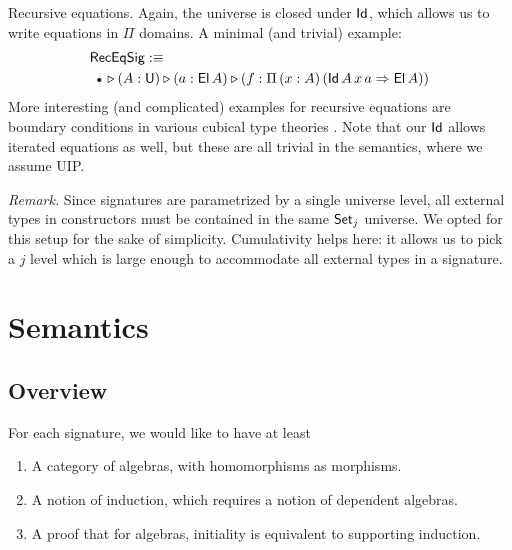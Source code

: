 \documentclass[sigplan,review,anonymous]{acmart}\settopmatter{printfolios=true,printccs=false,printacmref=false}
\makeatletter
\newcommand{\Lift}{\Uparrow}
\newcommand{\ext}{\triangleright}
\newcommand{\emptycon}{\scaleobj{.75}\bullet}
\newcommand{\Pii}{\Pi}
\newcommand{\appitt}{\mathop{{\scriptstyle @}}}
\newcommand{\IdU}{\mathsf{IdU}}
\newcommand{\arri}{\Rightarrow}
\makeatother
\begin{document}

\begin{example}{Recursive equations}. Again, the universe is closed under $\mathsf{Id}$, which allows us to write equations
in $\Pii$ domains. A minimal (and trivial) example:
\begin{alignat*}{3}
  & \mathsf{RecEqSig} :\equiv\\
  & \hspace{0.5em}\emptycon\,\ext (A : \U) \ext (a : \El\,A)\ext (f : \Pii\,(x : A)\,(\Id\,A\,x\,a\arri\El\,A))
\end{alignat*}
More interesting (and complicated) examples for recursive equations are boundary
conditions in various cubical type theories \cite{cohen2016cubical, angiuli2016computational, angiuli2018cartesian}. Note that our $\mathsf{Id}$
allows iterated equations as well, but these are all trivial in the semantics,
where we assume UIP.
\end{example}


\emph{Remark.} Since signatures are parametrized by a single universe level, all
external types in constructors must be contained in the same $\mathsf{Set}_j$
universe. We opted for this setup for the sake of simplicity. Cumulativity helps
here: it allows us to pick a $j$ level which is large enough to accommodate all
external types in a signature.


\section{Semantics}
\label{sec:semantics}

\subsection{Overview}\label{sec:overview}

For each signature, we would like to have at least
\begin{enumerate}
  \item A category of algebras, with homomorphisms as morphisms.
  \item A notion of induction, which requires a notion of dependent algebras.
  \item A proof that for algebras, initiality is equivalent to supporting induction.
\end{enumerate}
\end{document}
